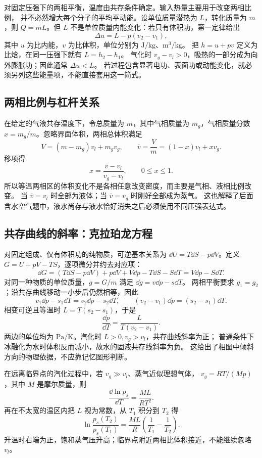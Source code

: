 {对固定压强下的两相平衡，温度由共存条件确定。输入热量主要用于改变两相比例，
并不必然增大每个分子的平均平动能。设单位质量潜热为 $L$，转化质量为 $m$，则
$Q=mL$。但 $L$ 不是单位质量内能变化：若只有体积功，第一定律给出
\begin{equation}
 \Delta u=L-p(v_2-v_1),
\end{equation}
其中 $u$ 为比内能，$v$ 为比体积，单位分别为 $\mathrm{J/kg}$、$\mathrm{m^3/kg}$。
把 $h=u+pv$ 定义为比焓，在同一压强下就有 $L=h_2-h_1$。
气化时 $v_g-v_l>0$，吸热的一部分成为向外膨胀功；因此通常 $\Delta u<L$。
若过程包含显著电功、表面功或动能变化，就必须另列这些能量项，不能直接套用这一简式。

\subsection{两相比例与杠杆关系}

在给定的气液共存温度下，令总质量为 $m$，其中气相质量为 $m_g$，气相质量分数
$x=m_g/m$。忽略界面体积，两相总体积满足
\[
 V=(m-m_g)v_l+m_gv_g,
 \qquad \bar v=\frac Vm=(1-x)v_l+xv_g.
\]
移项得
\begin{equation}
 x=\frac{\bar v-v_l}{v_g-v_l},\qquad 0\le x\le1.
\end{equation}
所以等温两相区的体积变化不是各相任意改变密度，而主要是气相、液相比例改变。
当 $\bar v=v_l$ 时全部为液体；当 $\bar v=v_g$ 时刚好全部成为蒸气。
这也解释了后面含水空气题中，液水尚存与液水恰好消失之后必须使用不同压强表达式。

\subsection{共存曲线的斜率：克拉珀龙方程}

对固定组成、仅有体积功的纯物质，可逆基本关系为
$\dd U=T\dd S-p\dd V$。定义 $G=U+pV-TS$，逐项微分并约去对应项：
\[
 \dd G=(T\dd S-p\dd V)+p\dd V+V\dd p-T\dd S-S\dd T
 =V\dd p-S\dd T.
\]
对同一种物质的单位质量，$g=G/m$ 满足 $\dd g=v\dd p-s\dd T$。
两相平衡要求 $g_1=g_2$；沿共存曲线移动一小步后仍然相等，因此
\[
 v_1\dd p-s_1\dd T=v_2\dd p-s_2\dd T,
 \qquad (v_2-v_1)\dd p=(s_2-s_1)\dd T.
\]
相变可逆且等温时 $L=T(s_2-s_1)$，于是
\begin{equation}
 \frac{\dd p}{\dd T}=\frac{L}{T(v_2-v_1)}.
\end{equation}
两边的单位均为 $\mathrm{Pa/K}$。汽化时 $L>0,v_g>v_l$，共存曲线斜率为正；
普通条件下冰融化为水时体积反而减小，故水的固液共存线斜率为负。
这给出了相图中倾斜方向的物理依据，不应靠记忆图形判断。

在远离临界点的汽化过程中，若 $v_g\gg v_l$、蒸气近似理想气体，
$v_g=RT/(Mp)$，其中 $M$ 是摩尔质量，则
\[
 \frac{\dd\ln p_s}{\dd T}=\frac{ML}{RT^2}.
\]
再在不太宽的温区内把 $L$ 视为常数，从 $T_1$ 积分到 $T_2$ 得
\begin{equation}
 \ln\frac{p_s(T_2)}{p_s(T_1)}
 =\frac{ML}{R}\left(\frac1{T_1}-\frac1{T_2}\right).
\end{equation}
升温时右端为正，饱和蒸气压升高；临界点附近两相比体积接近，不能继续忽略 $v_l$。


}
